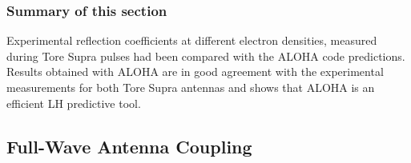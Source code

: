 \subsubsection{Summary of this section}

Experimental reflection coefficients at different electron densities, measured during Tore Supra pulses had been compared with the ALOHA code predictions. Results obtained with ALOHA are in good agreement with the experimental measurements for both Tore Supra antennas and shows that ALOHA is an efficient LH predictive tool. 

\subsection{Full-Wave Antenna Coupling}\label{sec:LHCD_FW_antena_coupling}



